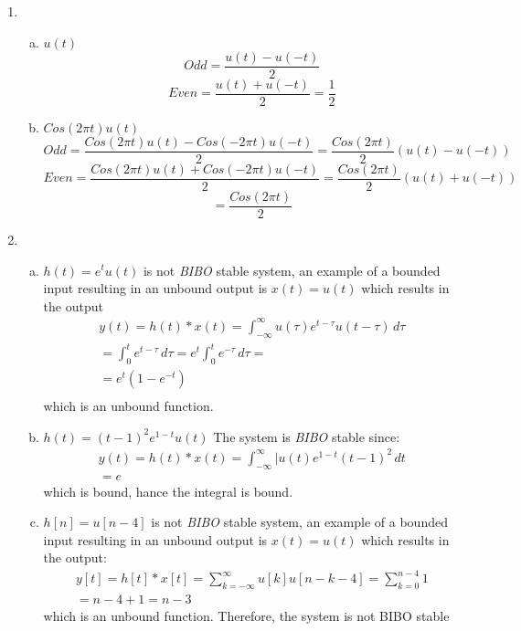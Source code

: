 \documentclass[10pt, letterpaper]{article}
\begin{document}
\begin{enumerate}[1)]
\item
    \begin{enumerate}[a.]
    \item $u(t)$
        \[ Odd = \frac{u(t) - u(-t)}{2}\]
        \[ Even = \frac{u(t) + u(-t)}{2} =  \frac{1}{2}\]

    \item $Cos(2\pi t)u(t)$
        \[Odd = \frac{Cos(2\pi t)u(t) - Cos(-2\pi t)u(-t)}{2} = \frac{Cos(2\pi t)}{2}(u(t) - u(-t))\]
        \[Even = \frac{Cos(2\pi t)u(t) + Cos(-2\pi t)u(-t)}{2} = \frac{Cos(2\pi t)}{2}(u(t) + u(-t))\]
        \[ = \frac{Cos(2\pi t)}{2}\]
    \end{enumerate}


\item
    \begin{enumerate}[a.]
    \item $h(t) = e^tu(t)$ is not \emph{BIBO} stable system, an example of a bounded input 
        resulting in an unbound output is $x(t) = u(t)$ which results in the output
        \begin{align*}
        y(t) = h(t) * x(t) = 
        \int_{-\infty}^{\infty} u(\tau)e^{t - \tau}u(t - \tau) \, d\tau \\
        = \int_{0}^{t}e^{t - \tau} \, d\tau 
        = e^t \int_{0}^{t}e^{-\tau} \, d\tau = \\
        = \boxed{e^t (1 - e^{-t})}
        \\
        \end{align*}
        which is an unbound function.

    \item $h(t) = (t - 1)^2e^{1-t}u(t)$ The system is \emph{BIBO} stable since:
        \begin{align*}
        	y(t) = h(t) * x(t) = 
        	\int_{-\infty}^{\infty} |u(t)e^{1 - t}(t - 1)^2 \, dt \\
        	= e
        \end{align*}
        which is bound, hance the integral is bound.
    
    \item $h[n] = u[n - 4]$ is not \emph{BIBO} stable system, an example of a bounded input 
        resulting in an unbound output is $x(t) = u(t)$ which results in the output:
        \begin{align*}
        y[t] = h[t] * x[t] = 
        \sum_{k = -\infty}^{\infty} u[k] u[n - k - 4] = \sum_{k = 0}^{n - 4} 1 \\
        = n - 4 + 1 = \boxed{n - 3}
        \end{align*}
        which is an unbound function. Therefore, the system is not BIBO stable


\end{enumerate}
\end{enumerate}
\end{document}

